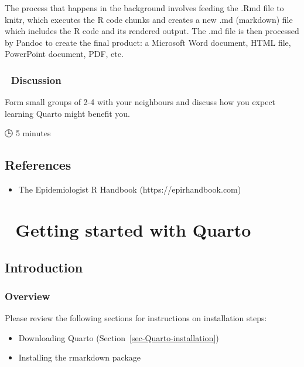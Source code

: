 \documentclass[
  letterpaper,
  DIV=11,
  numbers=noendperiod,
  oneside]{scrreprt}
\providecommand{\tightlist}{%
  \setlength{\itemsep}{0pt}\setlength{\parskip}{0pt}}\usepackage{longtable,booktabs,array}
\begin{document}
The process that happens in the background involves feeding the .Rmd
file to knitr, which executes the R code chunks and creates a new .md
(markdown) file which includes the R code and its rendered output. The
.md file is then processed by Pandoc to create the final product: a
Microsoft Word document, HTML file, PowerPoint document, PDF, etc.

\subsection{\texorpdfstring{{💬} Discussion}{💬 Discussion}}

Form small groups of 2-4 with your neighbours and discuss how you expect
learning Quarto might benefit you.

{🕒} 5 minutes

\hypertarget{references}{%
\section{References}\label{references}}

\begin{itemize}
\tightlist
\item
  The Epidemiologist R Handbook (https://epirhandbook.com)
\end{itemize}

\hypertarget{getting-started-with-quarto}{%
\chapter{\texorpdfstring{{📘} Getting started with
Quarto}{📘 Getting started with Quarto}}\label{getting-started-with-quarto}}

\hypertarget{introduction-6}{%
\section{Introduction}\label{introduction-6}}

\hypertarget{overview-4}{%
\subsection{Overview}\label{overview-4}}

Please review the following sections for instructions on installation
steps:

\begin{itemize}
\tightlist
\item
  Downloading Quarto (Section~\ref{sec-Quarto-installation})
\item
  Installing the rmarkdown package
\end{itemize}
\end{document}
